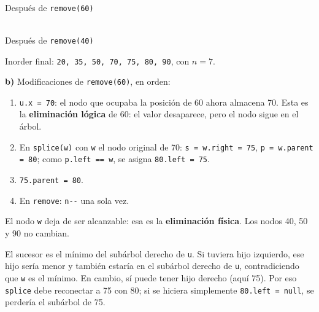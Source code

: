 \documentclass[11pt,a4paper]{article}
\begin{document}
\vspace{6pt}
\begin{center}
\begin{minipage}{0.48\textwidth}
\centering
{}\\
{\small Después de \texttt{remove(60)}}
\end{minipage}
\hfill
\begin{minipage}{0.48\textwidth}
\centering
{}\\
{\small Después de \texttt{remove(40)}}
\end{minipage}
\end{center}

Inorder final: \texttt{20, 35, 50, 70, 75, 80, 90}, con $n = 7$.

\textbf{b)} Modificaciones de \texttt{remove(60)}, en orden:
\begin{enumerate}[itemsep=0pt]
\item \texttt{u.x = 70}: el nodo que ocupaba la posición de 60 ahora almacena 70. Esta es la \textbf{eliminación lógica} de 60: el valor desaparece, pero el nodo sigue en el árbol.
\item En \texttt{splice(w)} con \texttt{w} el nodo original de 70: \texttt{s = w.right = 75}, \texttt{p = w.parent = 80}; como \texttt{p.left == w}, se asigna \texttt{80.left = 75}.
\item \texttt{75.parent = 80}.
\item En \texttt{remove}: \texttt{n-{}-} una sola vez.
\end{enumerate}
El nodo \texttt{w} deja de ser alcanzable: esa es la \textbf{eliminación física}. Los nodos 40, 50 y 90 no cambian.

El sucesor es el mínimo del subárbol derecho de \texttt{u}. Si tuviera hijo izquierdo, ese hijo sería menor y también estaría en el subárbol derecho de \texttt{u}, contradiciendo que \texttt{w} es el mínimo. En cambio, sí puede tener hijo derecho (aquí 75). Por eso \texttt{splice} debe reconectar a 75 con 80; si se hiciera simplemente \texttt{80.left = null}, se perdería el subárbol de 75.
\end{document}
